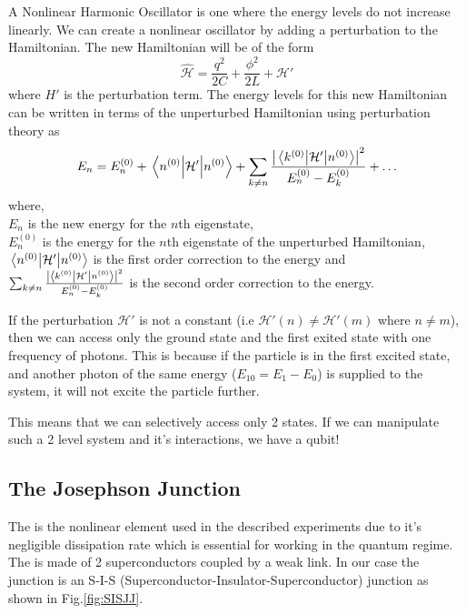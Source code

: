 A Nonlinear Harmonic Oscillator is one where the energy levels do not increase linearly. We can create a nonlinear oscillator by adding a perturbation to the Hamiltonian. The new Hamiltonian will be of the form
\begin{equation}
\hat{\mathcal{H}}=\frac{q^2}{2C}+\frac{\phi^2}{2L} +\mathcal{H}'
\end{equation}
where $H'$ is the perturbation term.
The energy levels for this new Hamiltonian can be written in terms of the unperturbed Hamiltonian using perturbation theory as
\begin{equation}
E_n=E_n^{(0)}+\expval{\mathcal{H}'}{n^{(0)}}+\sum_{k\neq n}\frac{\left|\mel{k^{(0)}}{\mathcal{H}'}{n^{(0)}}\right|^2}{E_n^{(0)}-E_k^{(0)}}+\ldots
\end{equation}
where,\\
$E_n$ is the new energy for the $n$th eigenstate,\\
$E_n^{(0)}$ is the energy for the $n$th eigenstate of the unperturbed Hamiltonian,\\
$\expval{\mathcal{H}'}{n^{(0)}}$ is the first order correction to the energy and\\
$\sum_{k\neq n}\frac{\left|\mel{k^{(0)}}{\mathcal{H}'}{n^{(0)}}\right|^2}{E_n^{(0)}-E_k^{(0)}}$ is the second order correction to the energy.

If the perturbation $\mathcal{H}'$ is not a constant (i.e $\mathcal{H}'(n)\neq \mathcal{H}'(m)$ where $n\neq m$), then we can access only the ground state and the first exited state with one frequency of photons. This is because if the particle is in the first excited state, and another photon of the same energy ($E_{10}=E_1-E_0$) is supplied to the system, it will not excite the particle further.

This means that we can selectively access only 2 states. If we can manipulate such a 2 level system and it's interactions, we have a qubit!

\subsection{The Josephson Junction}

The \JJ is the nonlinear element used in the described experiments due to it's negligible dissipation rate which is essential for working in the quantum regime.\\
The \JJ is made of 2 superconductors coupled by a weak link. In our case the junction is an S-I-S (Superconductor-Insulator-Superconductor) junction as shown in Fig.\ref{fig:SISJJ}.

